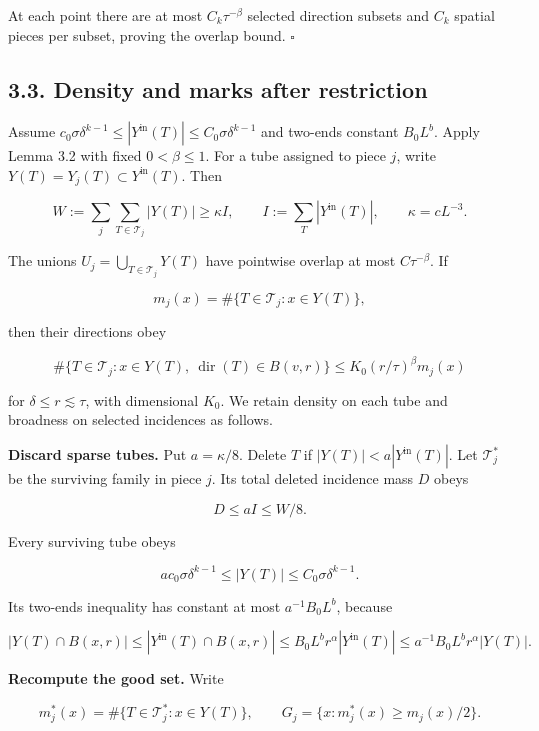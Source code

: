 \documentclass[
  11pt,
  a4paper,
]{article}
\begin{document}
At each point there are at most \(C_k\tau^{-\beta}\) selected direction
subsets and \(C_k\) spatial pieces per subset, proving the overlap
bound. \(\square\)

\hypertarget{density-and-marks-after-restriction}{%
\subsection{3.3. Density and marks after
restriction}\label{density-and-marks-after-restriction}}

Assume
\(c_0\sigma\delta^{k-1}\le |Y^{\mathrm{in}}(T)|\le C_0\sigma\delta^{k-1}\)
and two-ends constant \(B_0L^b\). Apply Lemma 3.2 with fixed
\(0<\beta\le1\). For a tube assigned to piece \(j\), write
\(Y(T)=Y_j(T)\subset Y^{\mathrm{in}}(T)\). Then

\[W:=\sum_j\sum_{T\in\mathcal T_j}|Y(T)|
 \ge\kappa I,
 \qquad I:=\sum_T|Y^{\mathrm{in}}(T)|,
 \qquad \kappa=cL^{-3}.
\tag{3.3}\label{eq:3.3}\]

The unions \(U_j=\bigcup_{T\in\mathcal T_j}Y(T)\) have pointwise overlap
at most \(C\tau^{-\beta}\). If

\[m_j(x)=\#\{T\in\mathcal T_j:x\in Y(T)\},\]

then their directions obey

\[\#\{T\in\mathcal T_j:x\in Y(T),\ \operatorname{dir}(T)\in B(v,r)\}
 \le K_0(r/\tau)^\beta m_j(x)
\tag{3.4}\label{eq:3.4}\]

for \(\delta\le r\lesssim\tau\), with dimensional \(K_0\). We retain
density on each tube and broadness on selected incidences as follows.

\textbf{Discard sparse tubes.} Put \(a=\kappa/8\). Delete \(T\) if
\(|Y(T)|<a|Y^{\mathrm{in}}(T)|\). Let \(\mathcal T_j^*\) be the
surviving family in piece \(j\). Its total deleted incidence mass \(D\)
obeys

\[D\le aI\le W/8.
\tag{3.5}\label{eq:3.5}\]

Every surviving tube obeys

\[ac_0\sigma\delta^{k-1}\le |Y(T)|\le C_0\sigma\delta^{k-1}.
\tag{3.6}\label{eq:3.6}\]

Its two-ends inequality has constant at most \(a^{-1}B_0L^b\), because

\[|Y(T)\cap B(x,r)|\le |Y^{\mathrm{in}}(T)\cap B(x,r)|
 \le B_0L^b r^\alpha |Y^{\mathrm{in}}(T)|
 \le a^{-1}B_0L^b r^\alpha |Y(T)|.
\tag{3.7}\label{eq:3.7}\]

\textbf{Recompute the good set.} Write

\[m_j^*(x)=\#\{T\in\mathcal T_j^*:x\in Y(T)\},
 \qquad G_j=\{x:m_j^*(x)\ge m_j(x)/2\}.\]
\end{document}
